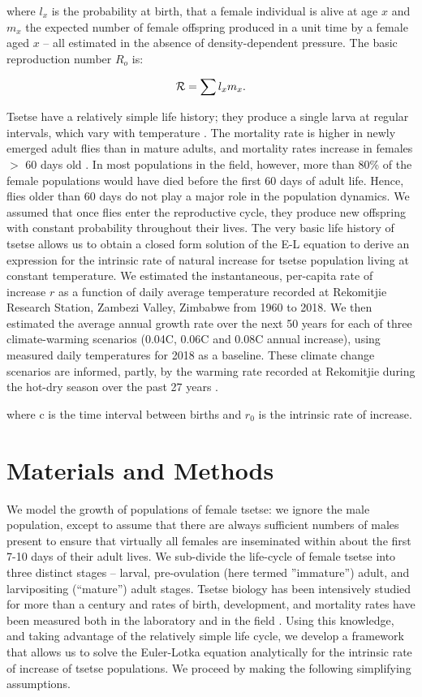 \documentclass[12pt,a4paper]{article}
\begin{document}
where  $l_{x}$ is the probability at birth, that a female individual is alive at age $x$ and $m_{x}$ the expected number of female offspring produced in a unit time by a female aged $x$ -- all estimated in the absence of density-dependent pressure.
The basic reproduction number $R_{o}$ is:

\begin{equation}
\label{eulerRepNumber}
{\cal R}= \sum l_{x}m_{x}. 
\end{equation}

Tsetse have a relatively simple life history; they produce a single larva at regular intervals, which vary with temperature \cite{hargrove2003tsetse}. The mortality rate is higher in newly emerged adult flies than in mature adults, and mortality rates increase in females $>$ 60 days old \cite{hargrove2020model}. In most populations in the field, however, more than 80\% of the female populations would have died before the first 60 days of adult life. Hence, flies older than 60 days do not play a major role in the population dynamics. We assumed that once flies enter the reproductive cycle, they produce new offspring with constant probability throughout their lives. The very basic life history of tsetse allows us to obtain a closed form solution of the E-L equation to derive an expression for the intrinsic rate of natural increase for tsetse population living at constant temperature. We estimated the instantaneous, per-capita rate of increase $r$ as a function of daily average temperature recorded at Rekomitjie Research Station, Zambezi Valley, Zimbabwe from 1960 to 2018. We then estimated the average annual growth rate over the next 50 years for each of three climate-warming scenarios (0.04\textdegree C, 0.06\textdegree C and 0.08\textdegree C annual increase), using measured daily temperatures for 2018 as a baseline. These climate change scenarios are informed, partly, by the warming rate recorded at Rekomitjie during the hot-dry season over the past 27 years \cite{Lord2018}.    


where c is the time interval between births and $r_0$ is the intrinsic rate of increase.
	
\section*{Materials and Methods}
We model the growth of populations of female tsetse: we ignore the male population, except to assume that there are always sufficient numbers of males present to ensure that virtually all females are inseminated within about the first 7-10 days of their adult lives. We sub-divide the life-cycle of female tsetse into three distinct stages – larval, pre-ovulation (here termed ''immature'') adult,  and larvipositing (``mature'') adult stages. Tsetse biology has been intensively studied for more than a century and rates of birth, development, and mortality rates have been measured both  in  the laboratory and  in the field \cite{Rogers2011,Hargrove2004a,Jarry2007,Hargrove2011,Hargrove2019a}. Using this knowledge, and taking advantage of the relatively simple life cycle, we develop a framework that allows us to solve the Euler-Lotka equation analytically for the intrinsic rate of increase of tsetse populations. We proceed by making the following simplifying assumptions.
\end{document}
